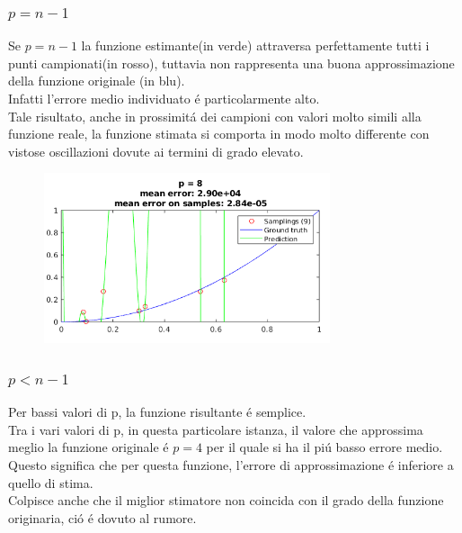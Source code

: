 \documentclass[12pt]{article}
\begin{document}
\subsubsection{$p=n-1$}
Se $p=n-1$ la funzione estimante(in verde) attraversa perfettamente tutti i punti campionati(in rosso),
tuttavia non rappresenta una buona approssimazione della funzione originale (in blu). \\
Infatti l'errore medio individuato é particolarmente alto. \\
Tale risultato, anche in prossimitá dei campioni con valori molto simili alla funzione reale,
la funzione stimata si comporta in modo molto differente con vistose oscillazioni dovute ai termini di grado elevato.

\begin{figure}[H]
  \centering
  \includegraphics[width=0.75\textwidth]{plots/regression/maximum_p.png}
\end{figure}

\subsubsection{$p<n-1$}

Per bassi valori di p, la funzione risultante é semplice. \\
Tra i vari valori di p, in questa particolare istanza,
il valore che approssima meglio la funzione originale é $p=4$
per il quale si ha il piú basso errore medio. \\
Questo significa che per questa funzione,
l'errore di approssimazione é inferiore a quello di stima. \\
Colpisce anche che il miglior stimatore non coincida con il grado della funzione originaria,
ció é dovuto al rumore. \\
\end{document}
